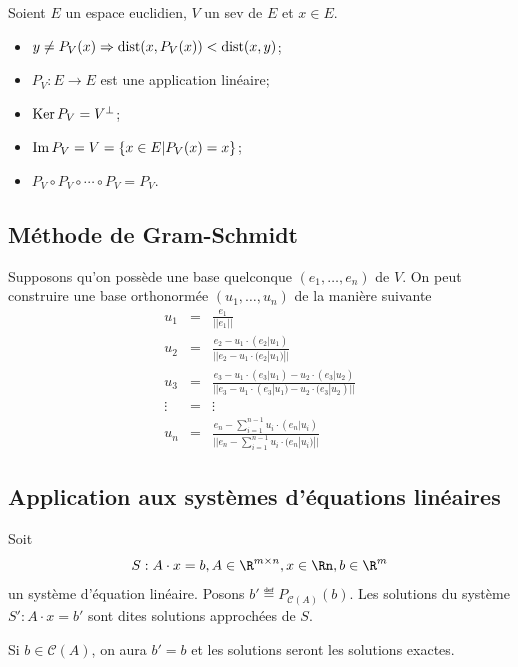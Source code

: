 \begin{myprop}
	Soient $E$ un espace euclidien, $V$ un sev de $E$ et $x \in E$.
	\begin{itemize}
		\item $y \neq P_V(x) \Rightarrow \operatorname{dist}(x, P_V(x)) < \operatorname{dist}(x, y)$;
		\item $P_V : E \to E$ est une application linéaire;
		\item $\operatorname{Ker} P_V = V^{\perp}$;
		\item $\operatorname{Im} P_V = V = \{x \in E | P_V(x) = x\}$;
		\item $P_V \circ P_V \circ \cdots \circ P_V = P_V$.
	\end{itemize}
\end{myprop}

\subsection{Méthode de Gram-Schmidt}

Supposons qu'on possède une base quelconque $(e_1, \dots , e_n)$ de $V$.
On peut construire une base orthonormée $(u_1, \dots, u_n)$ de la manière suivante
\begin{eqnarray*}
	u_1 &=& \frac{e_1}{||e_1||}\\
	u_2 &=& \frac{e_2 - u_1 \cdot (e_2|u_1)}{||e_2 - u_1 \cdot (e_2|u_1)||}\\
	u_3 &=& \frac{e_3 - u_1 \cdot (e_3|u_1) - u_2 \cdot (e_3|u_2)}{||e_3 - u_1 \cdot (e_3|u_1) - u_2 \cdot (e_3|u_2)||}\\
	\vdots &=& \vdots\\
	u_n &=& \frac{e_n - \sum_{i=1}^{n-1} u_i \cdot (e_n|u_i) }{ || e_n - \sum_{i=1}^{n-1} u_i \cdot (e_n|u_i) || }
\end{eqnarray*}

\subsection{Application aux systèmes d'équations linéaires}
Soit
\[ S : A \cdot x = b, A \in \R^{m \times n}, x \in \Rn, b \in \R^m \]
un système d'équation linéaire.
Posons $b' \eqdef P_{\mathcal{C}(A)}(b)$.
Les solutions du système $S' : A \cdot x = b'$ sont dites solutions approchées de $S$.

Si $b \in \mathcal{C}(A)$, on aura $b' = b$ et les solutions seront les solutions exactes.


